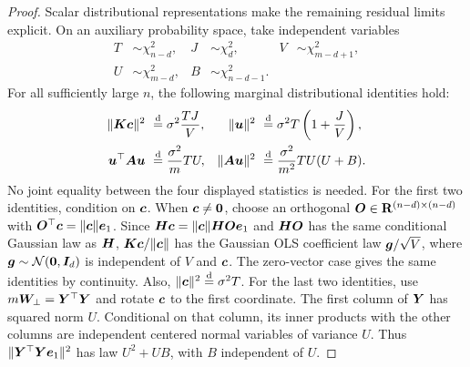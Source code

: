 \documentclass{article}
\theoremstyle{plain} %
\theoremstyle{definition} %
\theoremstyle{definition} %
\begin{document}
\begin{proof}
Scalar distributional representations make the remaining residual limits
explicit. On an auxiliary probability space, take independent variables
\begin{align*}
    T&\sim\chi^2_{n-d}, & J&\sim\chi^2_d,
    & V&\sim\chi^2_{m-d+1},\\
    U&\sim\chi^2_{m-d}, & B&\sim\chi^2_{n-d-1}.
\end{align*}
For all sufficiently large $n$, the following marginal distributional
identities hold:
\begin{align*}
    \lVert\boldsymbol{K}\boldsymbol{c}\rVert^2&\ \stackrel{\rm d}{=}
       \sigma^2\frac{TJ}{V},
    &
    \lVert\boldsymbol{u}\rVert^2&\ \stackrel{\rm d}{=}
       \sigma^2T\left(1+\frac JV\right),\\
    \boldsymbol{u}^\top\boldsymbol{A}\boldsymbol{u}&\ \stackrel{\rm d}{=}
       \frac{\sigma^2}{m}TU,
    &
    \lVert\boldsymbol{A}\boldsymbol{u}\rVert^2&\ \stackrel{\rm d}{=}
       \frac{\sigma^2}{m^2}TU(U+B).
\end{align*}
No joint equality between the four displayed statistics is needed.
For the first two identities, condition on $\boldsymbol{c}$. When $\boldsymbol{c}\ne\mathbf{0}$,
choose an orthogonal $\boldsymbol{O}\in{\mathbf{R}}^{(n-d)\times(n-d)}$ with
$\boldsymbol{O}^\top\boldsymbol{c}=\lVert\boldsymbol{c}\rVert\boldsymbol{e}_1$. Since
$\boldsymbol{H}\boldsymbol{c}=\lVert\boldsymbol{c}\rVert\boldsymbol{H}\boldsymbol{O}\boldsymbol{e}_1$ and $\boldsymbol{H}\boldsymbol{O}$ has the same conditional
Gaussian law as $\boldsymbol{H}$, $\boldsymbol{K}\boldsymbol{c}/\lVert\boldsymbol{c}\rVert$ has the Gaussian OLS coefficient law
$\boldsymbol{g}/\sqrt V$, where $\boldsymbol{g}\sim{\mathcal N}(\mathbf{0},\boldsymbol{I}_d)$ is independent
of $V$ and $\boldsymbol{c}$. The zero-vector case gives the same identities by
continuity. Also, $\lVert\boldsymbol{c}\rVert^2\stackrel{\rm d}{=}\sigma^2T$.
For the last two identities, use $m\boldsymbol{W}_\perp=\boldsymbol{Y}^\top\boldsymbol{Y}$ and rotate
$\boldsymbol{c}$ to the first coordinate. The first column of $\boldsymbol{Y}$ has squared
norm $U$. Conditional on that column, its inner products with the other
columns are independent centered normal variables of variance $U$.
Thus $\lVert\boldsymbol{Y}^\top\boldsymbol{Y}\boldsymbol{e}_1\rVert^2$ has law $U^2+UB$, with $B$
independent of $U$.


\end{proof}
\end{document}
